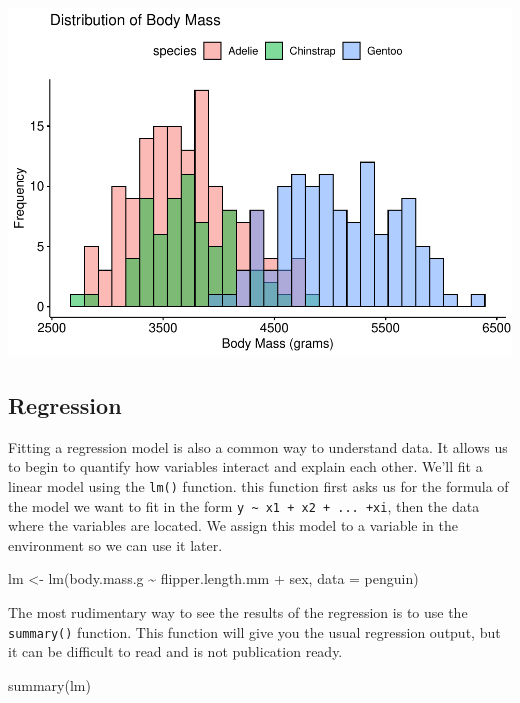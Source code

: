 \documentclass[
]{article}
\newenvironment{Shaded}{\begin{snugshade}}{\end{snugshade}}
\newcommand{\AttributeTok}[1]{\textcolor[rgb]{0.77,0.63,0.00}{#1}}
\newcommand{\FunctionTok}[1]{\textcolor[rgb]{0.00,0.00,0.00}{#1}}
\newcommand{\NormalTok}[1]{#1}
\newcommand{\OtherTok}[1]{\textcolor[rgb]{0.56,0.35,0.01}{#1}}
\newcommand{\SpecialCharTok}[1]{\textcolor[rgb]{0.00,0.00,0.00}{#1}}
\begin{document}
\includegraphics{Econ-Club-Example_files/figure-latex/ggpubr graph-1.pdf}

\hypertarget{regression}{%
\subsection{Regression}\label{regression}}

Fitting a regression model is also a common way to understand data. It
allows us to begin to quantify how variables interact and explain each
other. We'll fit a linear model using the \texttt{lm()} function. this
function first asks us for the formula of the model we want to fit in
the form \texttt{y\ \textasciitilde{}\ x1\ +\ x2\ +\ ...\ +xi}, then the
data where the variables are located. We assign this model to a variable
in the environment so we can use it later.

\begin{Shaded}
\begin{Highlighting}[]
\NormalTok{lm }\OtherTok{\textless{}{-}} \FunctionTok{lm}\NormalTok{(body.mass.g }\SpecialCharTok{\textasciitilde{}}\NormalTok{ flipper.length.mm }\SpecialCharTok{+}\NormalTok{ sex, }\AttributeTok{data =}\NormalTok{ penguin)}
\end{Highlighting}
\end{Shaded}

\pagebreak

The most rudimentary way to see the results of the regression is to use
the \texttt{summary()} function. This function will give you the usual
regression output, but it can be difficult to read and is not
publication ready.

\begin{Shaded}
\begin{Highlighting}[]
\FunctionTok{summary}\NormalTok{(lm)}
\end{Highlighting}
\end{Shaded}
\end{document}
